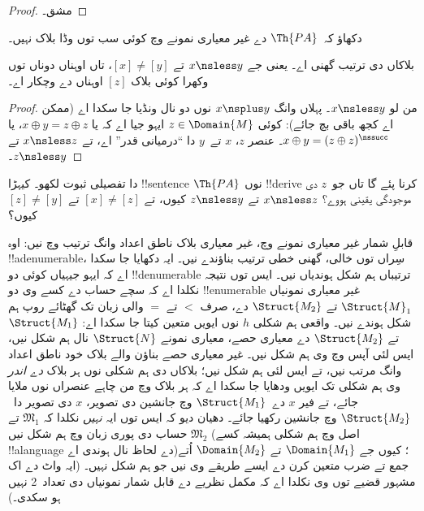 \documentclass[../../../include/open-logic-section]{subfiles}
\begin{document}
\begin{proof}
مشق۔
\end{proof}

\begin{prob}
دکھاؤ کہ~$\Th{PA}$ دے غیر معیاری نمونے وچ
کوئی سب توں وڈا بلاک نہیں۔
\end{prob}

\begin{prop}
بلاکاں دی ترتیب گھنی اے۔ یعنی جے $x \nsless y$
تے $[x] \neq [y]$، تاں اوہناں دوناں توں وکھرا
کوئی بلاک $[z]$ اوہناں دے وچکار اے۔
\end{prop}

\begin{proof}
من لو $x \nsless y$۔ پہلاں وانگ
$x \nsplus y$ نوں دو نال ونڈیا جا سکدا اے
(ممکن اے کجھ باقی بچ جائے): کوئی
$z \in \Domain{M}$ ایہو جیا اے کہ یا
$x \oplus y = z \oplus z$، یا
$x \oplus y = (z \oplus
z)^\nssucc$۔ عنصر $z$، $x$ تے~$y$ دا
“درمیانی قدر” اے، تے $x \nsless z$ تے
$z \nsless y$۔
\end{proof}

\begin{prob}
 دا تفصیلی
ثبوت لکھو۔ کیہڑا !!{sentence} $\Th{PA}$ نوں
!!{derive} کرنا پئے گا تاں جو~$z$ دی موجودگی
یقینی ہووے؟ $x \nsless z$ تے $z \nsless y$ کیوں،
تے $[x] \neq [z]$ تے $[z] \neq [y]$ کیوں؟
\end{prob}

\begin{explain}
قابلِ شمار غیر معیاری نمونے وچ، غیر معیاری بلاک ناطق اعداد وانگ ترتیب وچ
نیں: اوہ !!a{denumerable}، سِراں توں خالی،
گھنی خطی ترتیب بناؤندے نیں۔ ایہ دکھایا جا سکدا اے کہ
ایہو جیہیاں کوئی دو !!{denumerable} ترتیباں
ہم شکل ہوندیاں نیں۔ ایس توں نتیجہ نکلدا اے کہ
سچے حساب دے کسے وی دو !!{enumerable} غیر معیاری
نمونیاں $\Struct{M}_1$ تے $\Struct{M_2}$ دے،
صرف $<$ تے $=$ والی زبان تک گھٹائے روپ ہم شکل
ہوندے نیں۔ واقعی ہم شکلی $h$ نوں ایویں متعین
کیتا جا سکدا اے: $\Struct{M_1}$ تے
$\Struct{M_2}$ دے معیاری حصے، معیاری نمونے
$\Struct{N}$ نال ہم شکل نیں، ایس لئی آپس وچ
وی ہم شکل نیں۔ غیر معیاری حصے بناؤن والے بلاک
خود ناطق اعداد وانگ مرتب نیں، تے ایس لئی
ہم شکل نیں؛ بلاکاں دی ہم شکلی نوں ہر بلاک
\emph{دے اندر} وی ہم شکلی تک ایویں ودھایا جا
سکدا اے کہ ہر بلاک وچ من چاہے عنصراں نوں
ملایا جائے، تے فیر $x$ دے~$\Struct{M_1}$ وچ
جانشین دی تصویر، $x$ دی تصویر
دا~$\Struct{M_2}$ وچ جانشین رکھیا جائے۔
دھیان دیو کہ ایس توں ایہ \emph{نہیں} نکلدا کہ
$\mathfrak{M}_1$ تے $\mathfrak{M}_2$ حساب
دی پوری زبان وچ ہم شکل نیں (اصل وچ ہم شکلی
ہمیشہ کسے !!a{language} دے لحاظ نال ہوندی اے)؛
کیوں جے $\Domain{M_1}$ تے
$\Domain{M_2}$ اُتے جمع تے ضرب متعین کرن
دے ایسے طریقے وی نیں جو ہم شکل نہیں۔
(ایہ واٹ دے اک مشہور قضیے توں وی نکلدا اے
کہ مکمل نظریے دے قابل شمار نمونیاں دی تعداد~2
نہیں ہو سکدی۔)
\end{explain}
\end{document}
